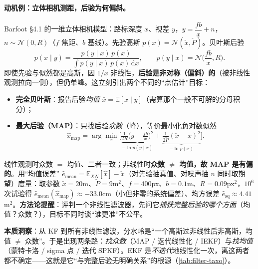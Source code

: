 \paragraph{动机例：立体相机测距，后验为何偏斜。}
Barfoot\cite{barfoot2024state} §4.1 的一维立体相机模型：路标深度 $x$、视差 $y$，$y=\dfrac{fb}{x}+n$，$n\sim\mathcal{N}(0,R)$（$f$ 焦距、$b$ 基线）。先验高斯 $p(x)=\mathcal{N}(\check{x},\check{P})$。贝叶斯后验
\begin{equation}
  p(x\mid y)=\frac{p(y\mid x)\,p(x)}{\int p(y\mid x)\,p(x)\,\mathrm{d}x},\qquad
  p(y\mid x)=\mathcal{N}\!\Big(\frac{fb}{x},R\Big).
  \label{eq:stereo-bayes}
\end{equation}
即使先验与似然都是高斯，因 $1/x$ 非线性，\textbf{后验是非对称（偏斜）的}（被非线性观测拉向一侧），但仍单峰。这立刻引出两个不同的“点估计”目标：

\begin{itemize}
  \item \textbf{完全贝叶斯}：报告后验\emph{均值} $\bar{x}=\mathbb{E}[x\mid y]$（需算那个一般不可解的分母积分）；
  \item \textbf{最大后验（MAP）}：只找后验\emph{众数}（峰），等价最小化负对数似然
  \begin{equation}
    \hat{x}_{\text{map}}=\arg\min_x\Big[\underbrace{\tfrac{1}{2R}\big(y-\tfrac{fb}{x}\big)^2}_{-\ln p(y\mid x)}+\underbrace{\tfrac{1}{2\check{P}}(\check{x}-x)^2}_{-\ln p(x)}\Big].
    \label{eq:stereo-map}
  \end{equation}
\end{itemize}
线性观测时众数 $=$ 均值、二者一致；非线性时\textbf{众数 $\ne$ 均值，故 MAP 是有偏的}。用“均值误差” $\hat{e}_{\text{mean}}=\mathbb{E}_{XN}[\hat{x}]-\check{x}$（对先验抽真值、对噪声抽 $n$ 同时取期望）度量：取参数 $\check{x}=20$m、$\check{P}=9$m$^2$、$f=400$px、$b=0.1$m、$R=0.09$px$^2$，$10^6$ 次试验得 $\hat{e}_{\text{mean}}(\hat{x}_{\text{map}})\approx-33.0$cm（小但非零的系统偏差）、均方误差 $\hat{e}_{\text{sq}}\approx4.41$m$^2$\cite{barfoot2024state}。\textbf{方法论提醒}：评判一个非线性滤波器，先问它\emph{捕获完整后验的哪个方面}（均值？众数？），目标不同时谈“谁更准”不公平。

\begin{insight}
\textbf{本质洞察}：从 KF 到所有非线性滤波，分水岭是“一个高斯过非线性后非高斯，均值 $\ne$ 众数”。于是出现两条路：\emph{找众数}（MAP / 迭代线性化 / IEKF）与\emph{找均值}（蒙特卡洛 / sigma 点 / 迭代 SPKF）。EKF 是\emph{不迭代}地线性化一次，离这两者都不确定——这就是它“与完整后验无明确关系”的根源（\cref{tab:filter-taxo}）。
\end{insight}

